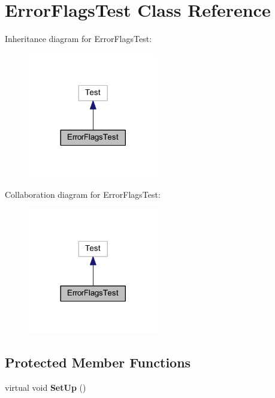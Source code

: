 \hypertarget{class_error_flags_test}{}\section{Error\+Flags\+Test Class Reference}
\label{class_error_flags_test}


Inheritance diagram for Error\+Flags\+Test\+:
\nopagebreak
\begin{figure}[H]
\begin{center}
\leavevmode
\includegraphics[width=161pt]{class_error_flags_test__inherit__graph}
\end{center}
\end{figure}


Collaboration diagram for Error\+Flags\+Test\+:
\nopagebreak
\begin{figure}[H]
\begin{center}
\leavevmode
\includegraphics[width=161pt]{class_error_flags_test__coll__graph}
\end{center}
\end{figure}
\subsection*{Protected Member Functions}
\begin{DoxyCompactItemize}
\item 
\hypertarget{class_error_flags_test_a14e4a93a156e1cb9e96b26d2a1dae27f}{}\label{class_error_flags_test_a14e4a93a156e1cb9e96b26d2a1dae27f} 
virtual void {\bfseries Set\+Up} ()
\end{DoxyCompactItemize}
